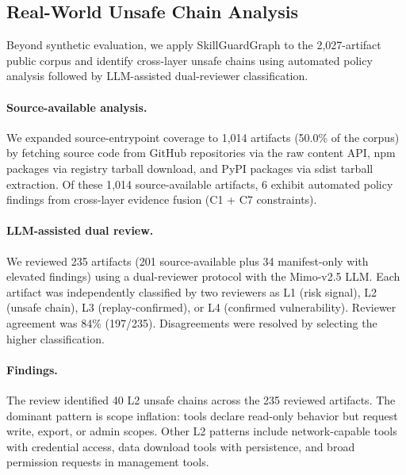 \documentclass[10pt]{article}
\begin{document}
\subsection{Real-World Unsafe Chain Analysis}
\label{sec:real_findings}

Beyond synthetic evaluation, we apply SkillGuardGraph to the 2{,}027-artifact public corpus and identify cross-layer unsafe chains using automated policy analysis followed by LLM-assisted dual-reviewer classification.

\paragraph{Source-available analysis.}
We expanded source-entrypoint coverage to 1{,}014 artifacts (50.0\% of the corpus) by fetching source code from GitHub repositories via the raw content API, npm packages via registry tarball download, and PyPI packages via sdist tarball extraction. Of these 1{,}014 source-available artifacts, 6 exhibit automated policy findings from cross-layer evidence fusion (C1 + C7 constraints).

\paragraph{LLM-assisted dual review.}
We reviewed 235 artifacts (201 source-available plus 34 manifest-only with elevated findings) using a dual-reviewer protocol with the Mimo-v2.5 LLM. Each artifact was independently classified by two reviewers as L1 (risk signal), L2 (unsafe chain), L3 (replay-confirmed), or L4 (confirmed vulnerability). Reviewer agreement was 84\% (197/235). Disagreements were resolved by selecting the higher classification.

\paragraph{Findings.}
The review identified 40 L2 unsafe chains across the 235 reviewed artifacts. The dominant pattern is scope inflation: tools declare read-only behavior but request write, export, or admin scopes. Other L2 patterns include network-capable tools with credential access, data download tools with persistence, and broad permission requests in management tools.
\end{document}
